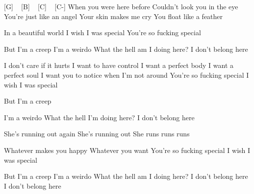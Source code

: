 [G] ~ [B] ~ [C] ~ [C-]
When you were here before
Couldn't look you in the eye
You're just like an angel
Your skin makes me cry
You float like a feather

In a beautiful world
I wish I was special
You're so fucking special

But I'm a creep
I'm a weirdo
What the hell am I doing here?
I don't belong here

I don't care if it hurts
I want to have control
I want a perfect body
I want a perfect soul
I want you to notice when I'm not around
You're so fucking special
I wish I was special

But I'm a creep

I'm a weirdo
What the hell I'm doing here?
I don't belong here

She's running out again
She's running out
She runs runs runs

Whatever makes you happy
Whatever you want
You're so fucking special
I wish I was special

But I'm a creep
I'm a weirdo
What the hell am I doing here?
I don't belong here
I don't belong here

